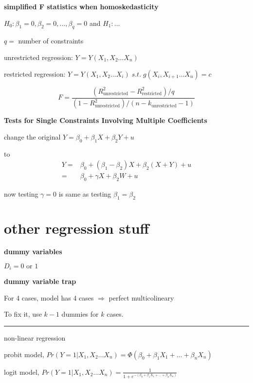\documentclass{article}
\newcommand*\sepline{%
  \begin{center}
    \rule[1ex]{.5\textwidth}{.5pt}
  \end{center}}
\begin{document}
\textbf{simplified F statistics when homoskedasticity}

$H_0: \beta_1=0,\beta_2=0,\dots,\beta_q=0$ and $H_1: \dots$

$q=$ number of constraints

unrestricted regression: $Y=Y(X_1,X_2\dots X_n)$

restricted regression: $Y=Y(X_1,X_2\dots X_i) \;s.t. \; g(X_i,X_{i+1}\dots X_n)=c$

\begin{equation}
  F=
  \frac{(R^2_{\text{unrestricted}}-R^2_{\text{restricted}})/q}{(1-R^2_{\text{unrestricted}})/(n-k_{\text{unrestricted}}-1)}
\end{equation}


\textbf{Tests for Single Constraints Involving Multiple Coefficients}

change the original
$Y=\beta_{0}+\beta_{1}X+\beta_{2}Y+u$ 

to
\begin{equation}
\begin{split}
  Y=&\beta_{0}+(\beta_1- \beta_{2})X+\beta_2 (X+Y)+u\\
  =&\beta_{0}+\gamma X +\beta_2 W+u
\end{split}
\end{equation}

now testing $\gamma=0$ is same as testing $\beta_{1}=\beta_{2}$




\section{other regression stuff}

\textbf{dummy variables}

$D_i=0 \text{ or } 1$

\textbf{dummy variable trap}

For 4 cases, model has 4 cases $\Rightarrow$ perfect multicolineary

To fix it, use $k-1$ dummies for $k$ cases.

\sepline

non-linear regression

probit model, $Pr(Y=1|X_1,X_2\dots X_n)=\Phi(\beta_0 +\beta_{1}X_1+\dots+\beta_{n} X_n)$

logit model, $Pr(Y=1|X_1,X_2\dots X_n)=\frac{1}{1+e^{-(\beta_0 +\beta_{1}X_1+\dots+\beta_{n} X_n)}}$
\end{document}
